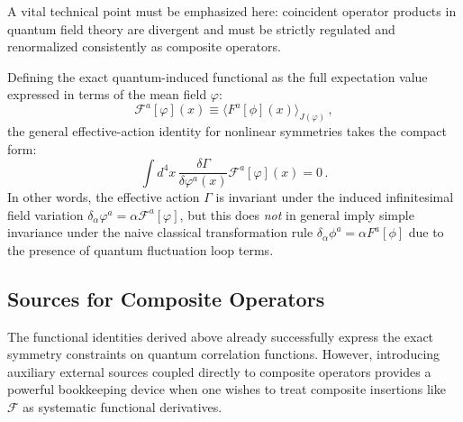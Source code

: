 A vital technical point must be emphasized here: coincident operator products in quantum field theory are divergent and must be strictly regulated and renormalized consistently as composite operators.

Defining the exact quantum-induced functional as the full expectation value expressed in terms of the mean field \(\varphi\):
\begin{equation} \label{eq:induced_functional_F}
    \mathcal{F}^a[\varphi](x) \equiv \langle F^a[\phi](x) \rangle_{J(\varphi)} \, ,
\end{equation}
the general effective-action identity for nonlinear symmetries takes the compact form:
\begin{equation} \label{eq:nonlinear_ward_Gamma}
    \boxed{\int d^4x \, \frac{\delta \Gamma}{\delta \varphi^a(x)} \mathcal{F}^a[\varphi](x) = 0} \, .
\end{equation}
In other words, the effective action \(\Gamma\) is invariant under the induced infinitesimal field variation \(\delta_\alpha \varphi^a = \alpha \mathcal{F}^a[\varphi]\), but this does \textit{not} in general imply simple invariance under the naive classical transformation rule \(\delta_\alpha \phi^a = \alpha F^a[\phi]\) due to the presence of quantum fluctuation loop terms.

\subsection{Sources for Composite Operators}

The functional identities derived above already successfully express the exact symmetry constraints on quantum correlation functions. However, introducing auxiliary external sources coupled directly to composite operators provides a powerful bookkeeping device when one wishes to treat composite insertions like \(\mathcal{F}\) as systematic functional derivatives.

